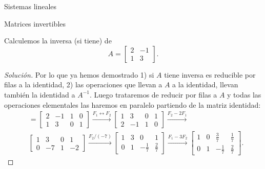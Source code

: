 \begin{chapter}{Sistemas lineales}
\begin{section}{Matrices invertibles}
            \begin{ejemplo*}
                Calculemos la inversa (si tiene) de 
                \begin{equation*}
                A=\begin{bmatrix}2&-1\\1&3 \end{bmatrix}.
                \end{equation*}
            \end{ejemplo*}
            \begin{proof}[Solución] Por lo que ya hemos demostrado 1) si $A$ tiene inversa es reducible por filas a la identidad, 2) las operaciones que llevan a $A$ a la identidad, llevan también la identidad  a $A^{-1}$. Luego  trataremos de reducir por filas a $A$ y todas las operaciones elementales las haremos en paralelo partiendo de la matriz identidad:
                \begin{align*}
                [A|\Id] &= \left[\begin{array}{cc|cc}2&-1 &  1&0\\1&3& 0&1\end{array}\right] 
                \stackrel{F_1\leftrightarrow F_2}{\longrightarrow} 
                \left[\begin{array}{cc|cc}1&3& 0&1\\2&-1 &  1&0 \end{array}\right]
                \stackrel{F_2-2 F_1}{\longrightarrow}\\
                &\left[\begin{array}{cc|cc}1&3& 0&1\\0&-7 &  1&-2 \end{array}\right]
                \stackrel{F_2/(-7)}{\longrightarrow} 
                \left[\begin{array}{cc|cc}1&3& 0&1\\0&1 &  -\frac17&\frac27\end{array}\right]
                \stackrel{F_1-3 F_2}{\longrightarrow}
                \left[\begin{array}{cc|cc}1&0&  \frac37&\frac17\\0&1 &  -\frac17&\frac27 \end{array}\right].

\end{align*}
\end{proof}
\end{section}
\end{chapter}
